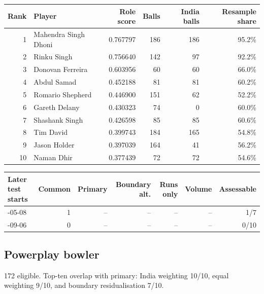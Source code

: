 \begin{center}
\begin{tabularx}{\linewidth}{r>{\raggedright\arraybackslash}Xrrrr}
\toprule
Rank & Player & Role score & Balls & India balls & Resample share \\
\midrule
1 & Mahendra Singh Dhoni & 0.767797 & 186 & 186 & 95.2\% \\
2 & Rinku Singh & 0.756640 & 142 & 97 & 92.2\% \\
3 & Donovan Ferreira & 0.603956 & 60 & 60 & 66.0\% \\
4 & Abdul Samad & 0.452188 & 81 & 81 & 60.2\% \\
5 & Romario Shepherd & 0.446900 & 151 & 62 & 52.2\% \\
6 & Gareth Delany & 0.430323 & 74 & 0 & 60.0\% \\
7 & Shashank Singh & 0.426598 & 85 & 85 & 60.6\% \\
8 & Tim David & 0.399743 & 184 & 165 & 54.8\% \\
9 & Jason Holder & 0.397039 & 164 & 41 & 56.2\% \\
10 & Naman Dhir & 0.377439 & 72 & 72 & 54.6\% \\
\bottomrule
\end{tabularx}
\end{center}

\begin{center}
\begin{tabularx}{\linewidth}{>{\raggedright\arraybackslash}Xrrrrrr}
\toprule
Later test starts & Common & Primary & Boundary alt. & Runs only & Volume & Assessable \\
\midrule
2024-05-08 & 1 & -- & -- & -- & -- & 1/7 \\
2025-09-06 & 0 & -- & -- & -- & -- & 0/10 \\
\bottomrule
\end{tabularx}
\end{center}

\subsection{Powerplay bowler}

172 eligible. Top-ten overlap with primary: India weighting 10/10, equal weighting 9/10, and boundary residualisation 7/10.

